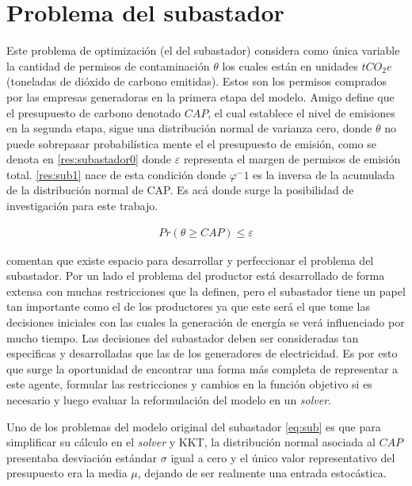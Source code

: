 \section{Problema del subastador}

Este problema de optimización (el del subastador) considera como única variable la cantidad de permisos de contaminación $\theta$ los cuales están en unidades $tCO_2 e$ (toneladas de dióxido de carbono emitidas). Estos son los permisos comprados por las empresas generadoras en la primera etapa del modelo. Amigo define que el presupuesto de carbono denotado $CAP$, el cual establece el nivel de emisiones en la segunda etapa, sigue una distribución normal de varianza cero, donde $\theta$ no puede sobrepasar probabilística mente el el presupuesto de emisión, como se denota en \ref{res:subastador0} donde $\varepsilon$ representa el margen de permisos de emisión total. \ref{res:sub1} nace de esta condición donde $\varphi^-1$ es la inversa de la acumulada de la distribución normal de CAP. Es acá donde surge la posibilidad de investigación para este trabajo. 
\vspace{2.5mm}

\begin{equation}
\begin{array}{cl}
    Pr(\theta \geq CAP)\leq \varepsilon \label{res:subastador0}
\end{array}
\end{equation}
\vspace{2.5mm}

 comentan que existe espacio para desarrollar y perfeccionar el problema del subastador. Por un lado el problema del productor está desarrollado de forma extensa con muchas restricciones que la definen, pero el subastador tiene un papel tan importante como el de los productores ya que este será el que tome las decisiones iniciales con las cuales la generación de energía se verá influenciado por mucho tiempo. Las decisiones del subastador deben ser consideradas tan especificas y desarrolladas que las de los generadores de electricidad. Es por esto que surge la oportunidad de encontrar una forma más completa de representar a este agente, formular las restricciones y cambios en la función objetivo si es necesario y luego evaluar la reformulación del modelo en un \textit{solver}.

Uno de los problemas del modelo original del subastador \ref{eq:sub} es que para simplificar su cálculo en el \textit{solver} y KKT, la distribución normal asociada al $CAP$ presentaba desviación estándar $\sigma$ igual a cero y el único valor representativo del presupuesto era la media $\mu$, dejando de ser realmente una entrada estocástica. 
\vspace{2.5mm}


